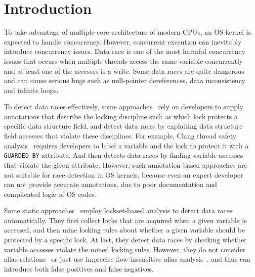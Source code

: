 \section{Introduction}
\label{sec_introduction}

To take advantage of multiple-core architecture of modern CPUs, an OS kernel is 
expected to handle concurrency. However, concurrent execution can inevitably 
introduce concurrency issues. Data race is one of the most harmful concurrency 
issues that occurs when multiple threads access the same variable concurrently 
and at least one of the accesses is a write. Some data races are quite 
dangerous and can cause serious bugs such as null-pointer dereferences, data 
inconsistency and infinite loops.

To detect data races effectively, some approaches~\cite{Boyapati:OOPSLA02, 
Anderson:PLDI08, Anderson:PLDI09, Zhou:MICRO19, Flanagan:PASTE01, 
Flanagan:PLDI00, Sadowski:PLATEAU14, ClangThreadSafety, Blackshear:OOPSLA18} 
rely on developers to 
supply annotations that describe the locking discipline such as which lock 
protects a specific data structure field, and detect data races by exploiting 
data structure field accesses that violate these disciplines. For example, 
Clang thread safety analysis~\cite{ClangThreadSafety} requires developers to 
label a variable and the lock to protect it with a {\tt GUARDED\_BY} attribute. 
And then detects data races by finding variable accesses that violate the given 
attribute. However, such annotation-based approaches are not suitable for race 
detection in OS kernels, because even an expert developer can not provide 
accurate annotations, due to poor documentation and complicated logic of OS 
codes.

Some static approaches~\cite{Choi:PLDI02, Engler:SOSP03, Voung:FSE07, 
Pratikakis:PLDI06, Naik:PLDI06} employ lockset-based analysis to detect data 
races automatically. They first collect locks that are acquired when a given 
variable is accessed, and then mine locking rules about whether a given 
variable should be protected by a specific lock. At last, they detect data 
races by checking whether variable accesses violate the mined locking rules. 
However, they do not consider alias relations~\cite{Voung:FSE07, Engler:SOSP03} 
or just use imprecise flow-insensitive alias analysis~\cite{Choi:PLDI02, 
Pratikakis:PLDI06, Naik:PLDI06}, and thus can introduce both false positives 
and false negatives.

